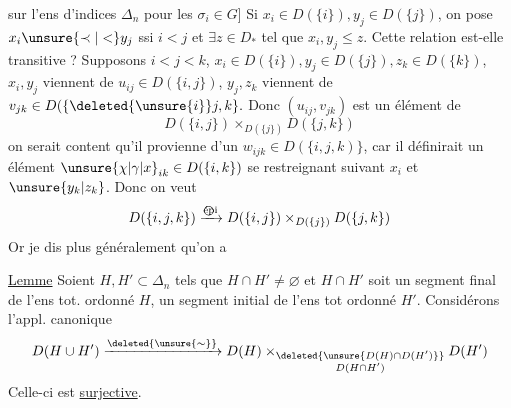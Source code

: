 sur l'ens d'indices $\Delta_n$ pour les $\sigma_i\in G$] Si  $x_i\in D(\{i\}),y_j\in D(\{j\})$, on pose $x_i\unsure{\prec|<}y_j$ ssi $i<j$ et $\exists z\in D_*$ tel que  $x_i,y_j\leq z$.
Cette relation est-elle transitive ? Supposons $i<j<k$, $x_i\in D(\{i\}),y_j\in D(\{j\}),z_k\in D(\{k\})$,  $x_i,y_j$ viennent de $u_{ij}\in D(\{i,j\})$, $y_j,z_k$ viennent
de $v_{jk}\in D(\{\deleted{\unsure{i}}j,k\}.$ Donc $(u_{ij},v_{jk})$ est un élément de
\[
D(\{i,j\})\mathbin{\times}_{D(\{j\})}D(\{j,k\})
\]
on serait content qu'il provienne d'un  $w_{ijk}\in D(\{i,j,k)\}$, car il  définirait un élément  $\unsure{\chi|\gamma|x}_{ik}\in D(\{i,k\})$  se restreignant suivant $x_i$ et $\unsure{y_k|z_k}$. Donc
on veut
\[
D(\{i,j,k\})\xrightarrow{\text{\textcircled{épi}}}D(\{i,j\})\mathbin{\times}_{D(\{j\})}D(\{j,k\})
\]
Or je dis plus généralement qu'on a

\uline{Lemme} Soient $H,H'\subset\Delta_n$ tels que $H\cap H'\ne\varnothing$ et $H\cap H'$ soit un segment final de l'ens tot. ordonné $H$, un segment initial de l'ens tot ordonné $H'$. Considérons l'appl. canonique
\[
D(H\cup H')\xrightarrow{\deleted{\unsure{\sim}}}D(H)\mathbin{\times}_{\substack{\deleted{\unsure{D(H)\cap D(H')}}\\ D(H\cap H')}}D(H')
\]
Celle-ci est \uline{surjective}.
